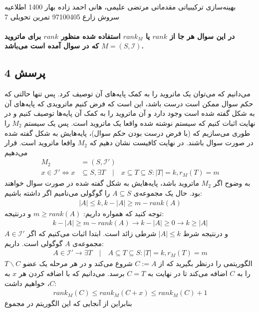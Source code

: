 \documentclass[a4paper,12pt]{article}
\newcounter{problemcounter}
\newcounter{subproblemcounter}
\newcommand{\problem}[1]
{
	\subsection*{
		پرسش
		#1
	}
}
\begin{document}
\handout
{بهینه‌سازی ترکیبیاتی مقدماتی}
{مرتضی علیمی، هانی احمد زاده}
{بهار 1400}
{اطلاعیه}
{سروش زارع}
{97100405}
 {تمرین تحویلی 7}
\paragraph{\color{blue}
در این سوال هر جا از $rank$ یا $rank_M$ استفاده شده منظور  $rank$ برای ماتروید  
$M = (S, \mathcal{I})$
 که در سوال آمده است می‌باشد.
}
\problem{4}
می‌دانیم که می‌توان یک ماتروید را به کمک پایه‌های آن توصیف کرد. پس تنها حالتی که حکم سوال ممکن است درست باشد، این است که فرض کنیم ماترویدی که پایه‌های آن به شکل گفته شده است وجود دارد و آن ماتروید را به کمک آن پایه‌ها توصیف کنیم و در نهایت اثبات کنیم که سیستم نوشته شده واقعا یک ماتروید است. پس یک سیستم $M_2$ را طوری می‌سازیم که (با فرض درست بودن حکم سوال)، پایه‌هایش به شکل گفته شده در صورت سوال باشند. در نهایت کافیست نشان دهیم که $M_2$ واقعا ماتروید است.
قرار می‌دهیم
\begin{align*}
	M_2 &= (S, \mathcal{I'} ) \\
	x \in \mathcal{I'} \iff x &\subseteq S , \exists T \quad | \quad x \subseteq T \subseteq S : |T| = k , r_M(T) = m
\end{align*}
به وضوح اگر $M_2$ ماتروید باشد، پایه‌هایش به شکل گفته شده در صورت سوال خواهند بود.
\newline
حال یک مجموعه‌ی $A \subseteq S$ را گوگولی می‌نامیم اگر داشته باشیم:
\begin{align*}
	|A| \leq k , k - |A| \geq m - rank(A)
\end{align*}
توجه کنید که همواره داریم:
$m \geq rank(A)$
و درنتیجه:
\begin{align*}
	k - |A| \geq m - rank(A) \rightarrow k - |A| \geq 0 \rightarrow k \geq |A|
\end{align*}
و درنتیجه شرط
$|A| \leq k$
شرطی زائد است.
\proof{}
ابتدا اثبات می‌کنیم که اگر
$A \in \mathcal{I'}$
مجموعه‌ی $A$ گوگولی است. داریم:
\begin{align*}
	A \in \mathcal{I'} \rightarrow \exists T \quad | \quad A \subseteq T \subseteq S : |T| = k , r_M(T) = m
\end{align*}
الگوریتمی را درنظر بگیرید که از $C := A$ شروع می‌کند و در هر مرحله یک عضو $T \backslash C$ را به $C$ اضافه می‌کند تا در نهایت به $C = T$ برسد. می‌دانیم که با اضافه کردن هر $x$ به $C$، خواهیم داشت:
\begin{align*}
	rank_M(C) \leq rank_M(C + x) \leq rank_M(C) + 1
\end{align*}
بنابراین از آنجایی که این الگوریتم در مجموع 
\end{document}
